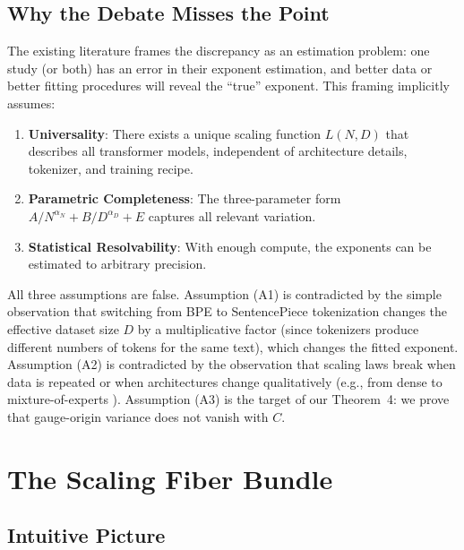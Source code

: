 \documentclass[12pt,a4paper]{article}
\theoremstyle{remark}
\newcommand{\Loss}{L}
\begin{document}
\subsection{Why the Debate Misses the Point}

The existing literature frames the discrepancy as an estimation problem: one study (or both) has an error in their exponent estimation, and better data or better fitting procedures will reveal the ``true'' exponent. This framing implicitly assumes:

\begin{enumerate}[label=(A\arabic*), leftmargin=*]
    \item \textbf{Universality}: There exists a unique scaling function $\Loss(N, D)$ that describes all transformer models, independent of architecture details, tokenizer, and training recipe.
    \item \textbf{Parametric Completeness}: The three-parameter form $A/N^{\alpha_N} + B/D^{\alpha_D} + E$ captures all relevant variation.
    \item \textbf{Statistical Resolvability}: With enough compute, the exponents can be estimated to arbitrary precision.
\end{enumerate}

All three assumptions are false. Assumption (A1) is contradicted by the simple observation that switching from BPE to SentencePiece tokenization changes the effective dataset size $D$ by a multiplicative factor (since tokenizers produce different numbers of tokens for the same text), which changes the fitted exponent. Assumption (A2) is contradicted by the observation that scaling laws break when data is repeated \cite{muennighoff2024scaling} or when architectures change qualitatively (e.g., from dense to mixture-of-experts \cite{clark2022unified}). Assumption (A3) is the target of our Theorem~4: we prove that gauge-origin variance does not vanish with $C$.

\section{The Scaling Fiber Bundle}
\label{sec:fiber}

\subsection{Intuitive Picture}
\end{document}
